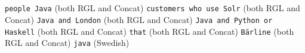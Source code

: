 \documentclass[
10pt, %
a4paper, %
oneside, %
headinclude,footinclude, %
BCOR5mm, %
]{scrartcl}
\title{\normalfont\spacedallcaps{Results, presentation notes}}
\author{\spacedlowsmallcaps{Martin Agfjord}}
\date{\small \today} %
\begin{document}
\renewcommand{\sectionmark}[1]{\markright{\spacedlowsmallcaps{#1}}}
\lehead{\mbox{\llap{\small\thepage\kern1em\color{halfgray} \vline}\color{halfgray}\hspace{0.5em}\rightmark\hfil}} %

\pagestyle{scrheadings} %

\maketitle %

\section*{}
\texttt{\Large people Java} (both RGL and Concat)
\newline
\newline
\texttt{\Large customers who use Solr} (both RGL and Concat)
\newline
\newline
\texttt{\Large Java and London} (both RGL and Concat)
\newline
\newline
\texttt{\Large Java and Python or Haskell} (both RGL and Concat)
\newline
\newline
\texttt{\Large that} (both RGL and Concat)
\newline
\newline
\texttt{\Large Bärline} (both RGL and Concat)
\newline
\newline
\texttt{\Large java} (Swedish)
\end{document}
